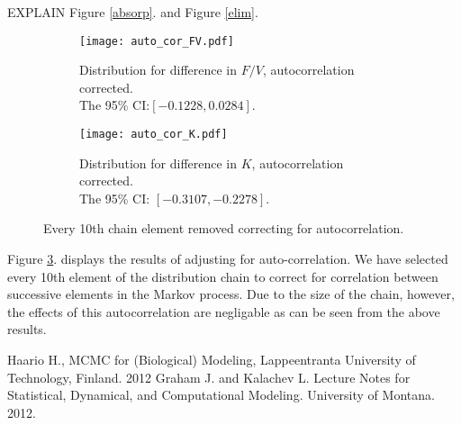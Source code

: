 \documentclass{article}
\newcommand{\figref}[1]{Figure \ref{#1}.}
\begin{document}
EXPLAIN \figref{absorp} and \figref{elim}

\begin{figure}[H]
  \begin{subfigure}[b]{.45\textwidth}
    \texttt{[image: auto\_cor\_FV.pdf]}
    \caption{Distribution for difference in $F/V$, autocorrelation corrected. \\
    The 95\% CI:$ [-0.1228,0.0284]$.}
     
    \label{autoabsorp}
  \end{subfigure}
  \begin{subfigure}[b]{.45\textwidth}
    \texttt{[image: auto\_cor\_K.pdf]}
    \caption{Distribution for difference in $K$, autocorrelation corrected.\\
    The 95\% CI: $[-0.3107,-0.2278]$.}
    
    \label{autoelim}
  \end{subfigure}
\caption{ Every 10th chain element removed correcting for autocorrelation. }
\label{autocor}
\end{figure}

\figref{autocor} displays the results of adjusting for auto-correlation. We have selected every 10th element of the distribution chain to correct for correlation between successive elements in the Markov process.  Due to the size of the chain, however, the effects of this autocorrelation are negligable as can be seen from the above results.

\begin{thebibliography}{[99]}
 Haario H., MCMC for (Biological) Modeling, Lappeentranta University of Technology, Finland. 2012
 Graham J. and Kalachev L.  Lecture Notes for Statistical, Dynamical, and Computational Modeling. University of Montana. 2012.
\end{thebibliography}
\end{document}
